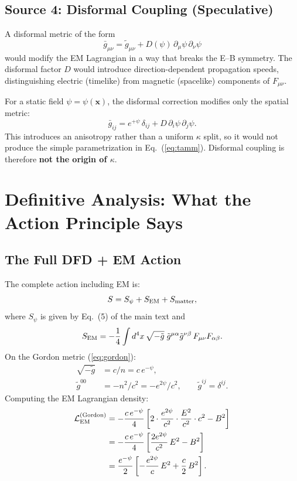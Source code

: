 \documentclass[11pt,a4paper]{article}
\theoremstyle{definition}
\theoremstyle{remark}
\begin{document}
\subsection{Source 4: Disformal Coupling (Speculative)}

A disformal metric of the form
\begin{equation}
\bar{g}_{\mu\nu} = \tilde{g}_{\mu\nu}
+ D(\psi)\,\partial_\mu\psi\,\partial_\nu\psi
\end{equation}
would modify the EM Lagrangian in a way that breaks the E--B symmetry.
The disformal factor $D$ would introduce direction-dependent propagation
speeds, distinguishing electric (timelike) from magnetic (spacelike)
components of $F_{\mu\nu}$.

For a static field $\psi = \psi(\mathbf{x})$, the disformal correction
modifies only the spatial metric:
\begin{equation}
\bar{g}_{ij} = e^{+\psi}\,\delta_{ij}
+ D\,\partial_i\psi\,\partial_j\psi.
\end{equation}
This introduces an anisotropy rather than a uniform $\kappa$ split,
so it would not produce the simple parametrization in
Eq.~(\ref{eq:tamm}).  Disformal coupling is therefore
\textbf{not the origin of $\kappa$}.

\section{Definitive Analysis: What the Action Principle Says}

\subsection{The Full DFD + EM Action}

The complete action including EM is:
\begin{equation}
S = S_\psi + S_{\rm EM} + S_{\rm matter},
\end{equation}
where $S_\psi$ is given by Eq.~(5) of the main text and
\begin{equation}\label{eq:SEM}
S_{\rm EM} = -\frac{1}{4}\int d^4x\,\sqrt{-\tilde{g}}\;
\tilde{g}^{\mu\alpha}\tilde{g}^{\nu\beta}\,F_{\mu\nu}F_{\alpha\beta}.
\end{equation}
On the Gordon metric (\ref{eq:gordon}):
\begin{align}
\sqrt{-\tilde{g}} &= c/n = c\,e^{-\psi}, \\
\tilde{g}^{00} &= -n^2/c^2 = -e^{2\psi}/c^2, \qquad
\tilde{g}^{ij} = \delta^{ij}.
\end{align}
Computing the EM Lagrangian density:
\begin{align}
\mathcal{L}_{\rm EM}^{\rm (Gordon)}
&= -\frac{c\,e^{-\psi}}{4}\left[
  2\cdot\frac{e^{2\psi}}{c^2}\cdot\frac{E^2}{c^2}\cdot c^2
  - B^2\right] \notag\\
&= -\frac{c\,e^{-\psi}}{4}\left[
  \frac{2e^{2\psi}}{c^2}\,E^2 - B^2\right] \notag\\
&= \frac{e^{-\psi}}{2}\left[
  -\frac{e^{2\psi}}{c}\,E^2 + \frac{c}{2}\,B^2\right].
\end{align}
\end{document}
